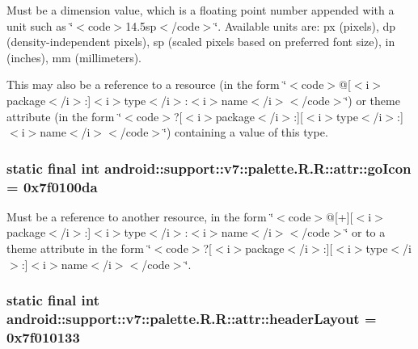 Must be a dimension value, which is a floating point number appended with a unit such as \char`\"{}$<$code$>$14.5sp$<$/code$>$\char`\"{}. Available units are: px (pixels), dp (density-independent pixels), sp (scaled pixels based on preferred font size), in (inches), mm (millimeters). 

This may also be a reference to a resource (in the form \char`\"{}$<$code$>$@\mbox{[}$<$i$>$package$<$/i$>$:\mbox{]}$<$i$>$type$<$/i$>$:$<$i$>$name$<$/i$>$$<$/code$>$\char`\"{}) or theme attribute (in the form \char`\"{}$<$code$>$?\mbox{[}$<$i$>$package$<$/i$>$:\mbox{]}\mbox{[}$<$i$>$type$<$/i$>$:\mbox{]}$<$i$>$name$<$/i$>$$<$/code$>$\char`\"{}) containing a value of this type. \hypertarget{classandroid_1_1support_1_1v7_1_1palette_1_1_r_1_1attr_5748c01c9363c4eb3ec66ecb62a418c0}{
\subsubsection[{goIcon}]{\setlength{\rightskip}{0pt plus 5cm}static final int android::support::v7::palette.R.R::attr::goIcon = 0x7f0100da}}
\label{classandroid_1_1support_1_1v7_1_1palette_1_1_r_1_1attr_5748c01c9363c4eb3ec66ecb62a418c0}


Must be a reference to another resource, in the form \char`\"{}$<$code$>$@\mbox{[}+\mbox{]}\mbox{[}$<$i$>$package$<$/i$>$:\mbox{]}$<$i$>$type$<$/i$>$:$<$i$>$name$<$/i$>$$<$/code$>$\char`\"{} or to a theme attribute in the form \char`\"{}$<$code$>$?\mbox{[}$<$i$>$package$<$/i$>$:\mbox{]}\mbox{[}$<$i$>$type$<$/i$>$:\mbox{]}$<$i$>$name$<$/i$>$$<$/code$>$\char`\"{}. \hypertarget{classandroid_1_1support_1_1v7_1_1palette_1_1_r_1_1attr_e626a0140f01c07771b0d7b67c285de4}{
\subsubsection[{headerLayout}]{\setlength{\rightskip}{0pt plus 5cm}static final int android::support::v7::palette.R.R::attr::headerLayout = 0x7f010133}}
\label{classandroid_1_1support_1_1v7_1_1palette_1_1_r_1_1attr_e626a0140f01c07771b0d7b67c285de4}


